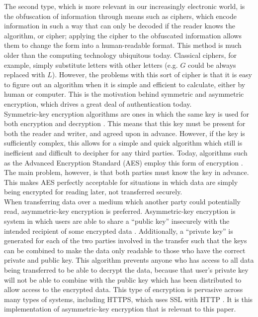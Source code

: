\documentclass[10pt]{article}
\begin{document}
\begin{multicols}{2}
The second type, which is more relevant in our increasingly electronic world, is the obfuscation of information through means such as ciphers, which encode information in such a way that can only be decoded if the reader knows the algorithm, or cipher; applying the cipher to the obfuscated information allows them to change the form into a human-readable format. This method is much older than the computing technology ubiquitous today. Classical ciphers, for example, simply substitute letters with other letters (e.g. $G$ could be always replaced with $L$). However, the problems with this sort of cipher is that it is easy to figure out an algorithm when it is simple and efficient to calculate, either by human or computer. This is the motivation behind symmetric and asymmetric encryption, which drives a great deal of authentication today. \\

Symmetric-key encryption algorithms are ones in which the same key is used for both encryption and decryption \cite{cryptography}. This means that this key must be present for both the reader and writer, and agreed upon in advance. However, if the key is sufficiently complex, this allows for a simple and quick algorithm which still is inefficient and difficult to decipher for any third parties. Today, algorithms such as the Advanced Encryption Standard (AES) employ this form of encryption \cite{aes}. The main problem, however, is that both parties must know the key in advance. This makes AES perfectly acceptable for situations in which data are simply being encrypted for reading later, not transferred securely. \\

When transferring data over a medium which another party could potentially read, asymmetric-key encryption is preferred. Asymmetric-key encryption is system in which users are able to share a ``public key'' insecurely with the intended recipient of some encrypted data \cite{ssl}. Additionally, a ``private key'' is generated for each of the two parties involved in the transfer such that the keys can be combined to make the data only readable to those who have the correct private and public key. This algorithm prevents anyone who has access to all data being transferred to be able to decrypt the data, because that user's private key will not be able to combine with the public key which has been distributed to allow access to the encrypted data. This type of encryption is pervasive across many types of systems, including HTTPS, which uses SSL with HTTP \cite{ssl}.  It is this implementation of asymmetric-key encryption that is relevant to this paper. \\


\end{multicols}
\end{document}
